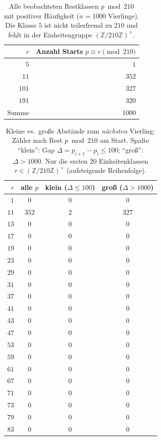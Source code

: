 \documentclass[11pt,a4paper]{article}
\begin{document}
\begin{table}[htbp]
  \centering
  \caption{Alle beobachteten Restklassen $p \bmod 210$ mit positiver Häufigkeit ($n=1000$ Vierlinge). Die Klasse $5$ ist nicht teilerfremd zu $210$ und fehlt in der Einheitengruppe $(\mathbb{Z}/210\mathbb{Z})^\times$.}
  \label{tab:mod210-summary}
  \begin{tabular}{@{}rr@{}}
    \toprule
    $r$ & Anzahl Starts $p \equiv r \pmod{210}$ \\
    \midrule
    $5$   & $1$ \\
    $11$  & $352$ \\
    $101$ & $327$ \\
    $191$ & $320$ \\
    \midrule
    Summe & $1000$ \\
    \bottomrule
  \end{tabular}
\end{table}

\begin{table}[htbp]
  \centering
  \caption{Kleine vs.\ große Abstände zum \emph{nächsten} Vierling: Zähler nach Rest $p \bmod 210$ am Start. Spalte ``klein'': Gap $\Delta = p_{i+1}-p_i \leq 100$; ``groß'': $\Delta > 1000$. Nur die ersten $20$ Einheitenklassen $r \in (\mathbb{Z}/210\mathbb{Z})^\times$ (aufsteigende Reihenfolge).}
  \label{tab:small-large-gaps}
  \begin{tabular}{@{}rccc@{}}
    \toprule
    $r$ & alle $p$ & klein ($\Delta\le100$) & groß ($\Delta>1000$) \\
    \midrule
    $1$ & $0$ & $0$ & $0$ \\
    $11$ & $352$ & $2$ & $327$ \\
    $13$ & $0$ & $0$ & $0$ \\
    $17$ & $0$ & $0$ & $0$ \\
    $19$ & $0$ & $0$ & $0$ \\
    $23$ & $0$ & $0$ & $0$ \\
    $29$ & $0$ & $0$ & $0$ \\
    $31$ & $0$ & $0$ & $0$ \\
    $37$ & $0$ & $0$ & $0$ \\
    $41$ & $0$ & $0$ & $0$ \\
    $43$ & $0$ & $0$ & $0$ \\
    $47$ & $0$ & $0$ & $0$ \\
    $53$ & $0$ & $0$ & $0$ \\
    $59$ & $0$ & $0$ & $0$ \\
    $61$ & $0$ & $0$ & $0$ \\
    $67$ & $0$ & $0$ & $0$ \\
    $71$ & $0$ & $0$ & $0$ \\
    $73$ & $0$ & $0$ & $0$ \\
    $79$ & $0$ & $0$ & $0$ \\
    $83$ & $0$ & $0$ & $0$ \\
    \bottomrule
  \end{tabular}
\end{table}
\end{document}
